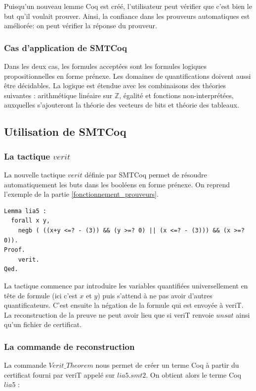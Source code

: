 \documentclass[11pt]{article}
\begin{document}
Puisqu'un nouveau lemme Coq est créé, l'utilisateur peut vérifier que c'est bien le but qu'il voulait prouver. Ainsi, la confiance dans les prouveurs automatiques est améliorée: on peut vérifier la réponse du prouveur.


\subsubsection{Cas d'application de SMTCoq}

Dans les deux cas, les formules acceptées sont les formules logiques propositionnelles en forme prénexe. Les domaines de quantifications doivent aussi être décidables. La logique est étendue avec les combinaisons des théories suivantes : arithmétique linéaire sur $\mathbb{Z}$, égalité et fonctions non-interprétées, auxquelles s'ajouteront la théorie des vecteurs de bits et théorie des tableaux. 

\subsection{Utilisation de SMTCoq}

\subsubsection{La tactique $verit$}

La nouvelle tactique $verit$ définie par SMTCoq permet de résoudre automatiquement les buts dans les booléens en forme prénexe. On reprend l'exemple de la partie \ref{fonctionnement_prouveurs}.

\begin{lstlisting}[frame=single]
Lemma lia5 : 
  forall x y,
    negb ( ((x+y <=? - (3)) && (y >=? 0) || (x <=? - (3))) && (x >=? 0)).
Proof.
    verit.
Qed.
\end{lstlisting}

La tactique commence par introduire les variables quantifiées universellement en tête de formule (ici c'est $x$ et $y$) puis s'attend à ne pas avoir d'autres quantificateurs. C'est ensuite la négation de la formule qui est envoyée à veriT. La reconstruction de la preuve ne peut avoir lieu que si veriT renvoie $unsat$ ainsi qu'un fichier de certificat.

\subsubsection{La commande de reconstruction}

La commande $Verit\_Theorem$ nous permet de créer un terme Coq à partir du certificat fourni par veriT appelé sur $lia5.smt2$. On obtient alors le terme Coq $lia5$ : \\
\end{document}
